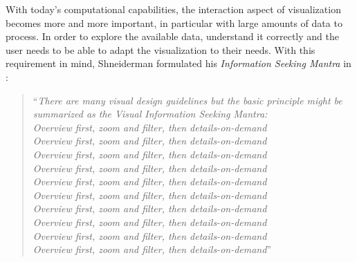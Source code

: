 With today's computational capabilities, the interaction aspect of visualization becomes more and more important, in particular with large amounts of data to process.
In order to explore the available data, understand it correctly and  the user needs to be able to adapt the visualization to their needs.
With this requirement in mind, Shneiderman formulated his \emph{Information Seeking Mantra} in \cite{Shneiderman:1996:TheEyesHaveIt}:
\begin{quote}
	``\emph{There are many visual design guidelines but the basic principle might be summarized as the Visual Information Seeking Mantra:\\
		\hspace*{2em}Overview first, zoom and filter, then details-on-demand\\
		\hspace*{2em}Overview first, zoom and filter, then details-on-demand\\
		\hspace*{2em}Overview first, zoom and filter, then details-on-demand\\
		\hspace*{2em}Overview first, zoom and filter, then details-on-demand\\
		\hspace*{2em}Overview first, zoom and filter, then details-on-demand\\
		\hspace*{2em}Overview first, zoom and filter, then details-on-demand\\
		\hspace*{2em}Overview first, zoom and filter, then details-on-demand\\
		\hspace*{2em}Overview first, zoom and filter, then details-on-demand\\
		\hspace*{2em}Overview first, zoom and filter, then details-on-demand\\
		\hspace*{2em}Overview first, zoom and filter, then details-on-demand}''	
\end{quote}


